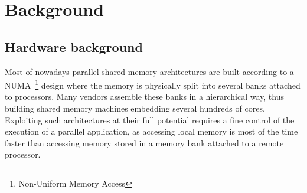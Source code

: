 \documentclass{Styles/llncs}
\newcommand{\benchs}{KASTORS }
\begin{document}

\section{Background}
\label{sec:background}
\subsection{Hardware background}
\label{sec:hardware}
Most of nowadays parallel shared memory architectures are built according to a NUMA~\footnote{Non-Uniform Memory Access} design where the memory is physically split into several banks attached to processors.
Many vendors assemble these banks in a hierarchical way, thus building shared memory machines embedding several hundreds of cores.
Exploiting such architectures at their full potential requires a fine control of the execution of a parallel application, as accessing local memory is most of the time faster than accessing memory stored in a memory bank attached to a remote processor.
\end{document}
